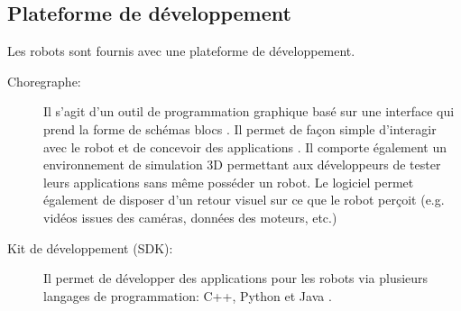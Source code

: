 \subsection{Plateforme de développement}
\label{Entreprise:Les produits: Nao: Plateforme de développement}
Les robots sont fournis avec une plateforme de développement.
\begin{description}
	\item[Choregraphe:] Il s'agit d'un outil de programmation graphique basé sur une interface qui prend la forme de schémas blocs \cite{ChoregrapheTech}. Il permet de façon simple d'interagir avec le robot et de concevoir des applications . Il comporte également un environnement de simulation 3D permettant aux développeurs de tester leurs applications sans même posséder un robot. Le logiciel permet également de disposer d'un retour visuel sur ce que le robot perçoit (e.g. vidéos issues des caméras, données des moteurs, etc.) 
	
	\item[Kit de développement (SDK):] Il permet de développer des applications pour les robots via plusieurs langages de programmation:  C++, Python et Java \cite{SDKTech}.
\end{description}

